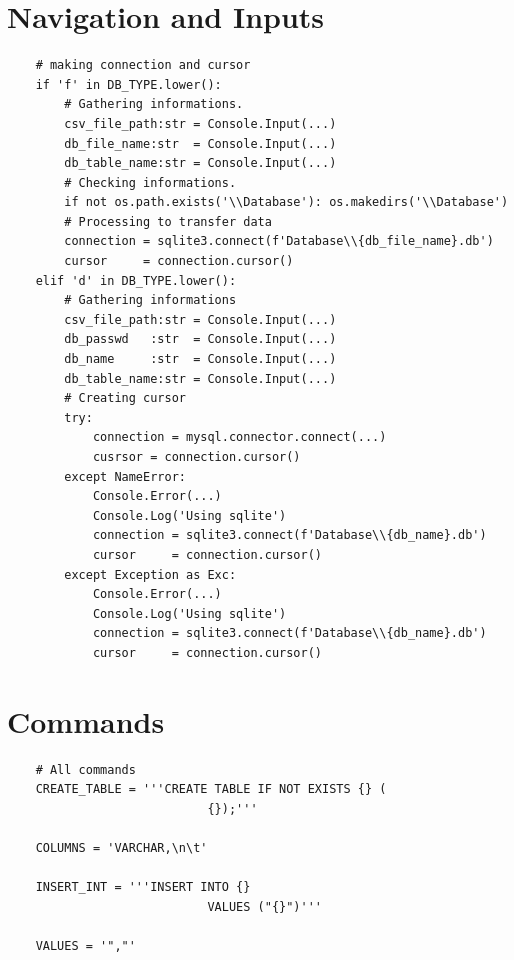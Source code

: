 \documentclass[12pt,a4paper]{report}
\begin{document}
        \section{Navigation and Inputs}
        \begin{verbatim}
    # making connection and cursor
    if 'f' in DB_TYPE.lower():
        # Gathering informations.
        csv_file_path:str = Console.Input(...)
        db_file_name:str  = Console.Input(...)
        db_table_name:str = Console.Input(...)
        # Checking informations.
        if not os.path.exists('\\Database'): os.makedirs('\\Database')
        # Processing to transfer data
        connection = sqlite3.connect(f'Database\\{db_file_name}.db')
        cursor     = connection.cursor()
    elif 'd' in DB_TYPE.lower():
        # Gathering informations
        csv_file_path:str = Console.Input(...)
        db_passwd   :str  = Console.Input(...)
        db_name     :str  = Console.Input(...)
        db_table_name:str = Console.Input(...)
        # Creating cursor
        try:
            connection = mysql.connector.connect(...)
            cusrsor = connection.cursor()
        except NameError:
            Console.Error(...)
            Console.Log('Using sqlite')
            connection = sqlite3.connect(f'Database\\{db_name}.db')
            cursor     = connection.cursor()
        except Exception as Exc:
            Console.Error(...)
            Console.Log('Using sqlite')
            connection = sqlite3.connect(f'Database\\{db_name}.db')
            cursor     = connection.cursor()\end{verbatim}  
\newpage
        \section{Commands}
        \begin{verbatim}
    # All commands
    CREATE_TABLE = '''CREATE TABLE IF NOT EXISTS {} (
                            {});'''
    
    COLUMNS = 'VARCHAR,\n\t'
    
    INSERT_INT = '''INSERT INTO {}
                            VALUES ("{}")'''
    
    VALUES = '","'
        \end{verbatim}
\end{document}
